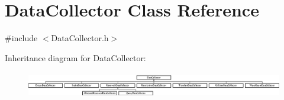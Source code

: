 \hypertarget{classDataCollector}{}\section{Data\+Collector Class Reference}
\label{classDataCollector}


{\ttfamily \#include $<$Data\+Collector.\+h$>$}

Inheritance diagram for Data\+Collector\+:\begin{figure}[H]
\begin{center}
\leavevmode
\includegraphics[height=1.170732cm]{classDataCollector}
\end{center}
\end{figure}
